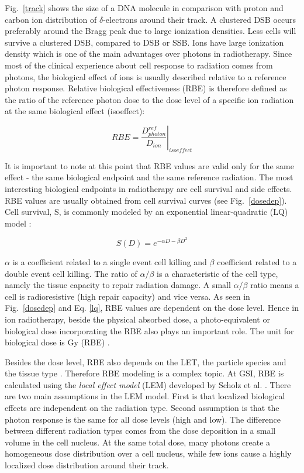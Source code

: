 \documentclass[type=dr, dr=rernat, accentcolor=tud7b,colorbacktitle, bigchapter, openright, twoside, 12pt ]{tudthesis}
\begin{document}
Fig.~\ref{track} shows the size of a DNA molecule in comparison with proton and carbon ion distribution of $\delta$-electrons around their track. 
A clustered DSB occurs preferably around the Bragg peak due to large ionization densities. Less cells will survive a clustered DSB, compared to DSB or SSB. Ions have large ionization density which is one of the main advantages over photons in radiotherapy. Since most of the clinical experience about
cell response to radiation comes from photons, the biological effect of ions is usually described relative to a reference photon response. Relative biological effectiveness (RBE) is therefore defined as the ratio of the reference 
photon dose to the dose level of a specific ion radiation at the same biological effect (isoeffect):

\begin{equation}
 RBE = \left.\frac{D^{ref}_{photon}}{D_{ion}} \right|_{isoeffect}
\end{equation}

It is important to note at this point that RBE values are valid only for the same effect - the same biological endpoint and the same reference radiation. The most interesting biological endpoints in radiotherapy are cell survival and
side effects. RBE values are usually obtained from cell survival curves (see Fig.~\ref{dosedep}). Cell survival, S, is commonly modeled by an exponential linear-quadratic (LQ) model \cite{Fowler1989}:

\begin{equation}
 S(D) = e^{-\alpha D - \beta D^2}
 \label{lq}
\end{equation}

$\alpha$ is a coefficient related to a single event cell killing and $\beta$ coefficient related to a double event cell killing. The ratio of $\alpha / \beta$ is a characteristic of the cell type, namely the tissue 
capacity to repair radiation damage. A small $\alpha / \beta$ ratio means a cell is radioresistive (high repair capacity) and vice versa.
As seen in Fig.~\ref{dosedep} and Eq. \ref{lq}, RBE values are dependent on the dose level. Hence in ion radiotherapy, beside the physical absorbed dose, a photo-equivalent or biological dose incorporating the RBE also plays an important role. 
The unit for biological dose is Gy (RBE) \cite{ICRU2007}. 

Besides the dose level, RBE also depends on the LET, the particle species and the tissue type \cite{Kraft2000}. Therefore RBE modeling is a complex topic.
At GSI, RBE is calculated using the \textit{local effect model} (LEM) developed by Scholz et al. \cite{Scholz1994}. There are two main assumptions in the LEM model. First is that localized biological 
effects are independent on the radiation type. Second assumption is that the photon response is the same for all dose levels (high and low).
The difference between different radiation types comes from the dose deposition in a small volume in the cell nucleus.
At the same total dose, many photons create a homogeneous dose distribution over a cell nucleus, while few ions cause a highly localized dose distribution around their track.
\end{document}
